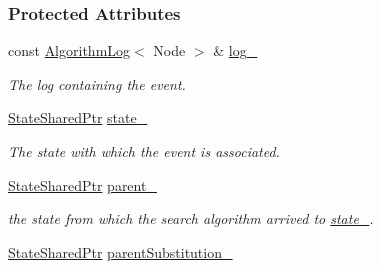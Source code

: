 \subsubsection*{Protected Attributes}
\begin{DoxyCompactItemize}
\item 
const \hyperlink{structslb_1_1core_1_1ui_1_1AlgorithmLog}{Algorithm\+Log}$<$ Node $>$ \& \hyperlink{structslb_1_1core_1_1ui_1_1EventBase_a188bf6c9b61aece44727bee80c0f284c}{log\+\_\+}\hypertarget{structslb_1_1core_1_1ui_1_1EventBase_a188bf6c9b61aece44727bee80c0f284c}{}\label{structslb_1_1core_1_1ui_1_1EventBase_a188bf6c9b61aece44727bee80c0f284c}

\begin{DoxyCompactList}\small\item\em The log containing the event. \end{DoxyCompactList}\item 
\hyperlink{structslb_1_1core_1_1ui_1_1EventBase_a50419d00607aad434bb97138eabe2c94}{State\+Shared\+Ptr} \hyperlink{structslb_1_1core_1_1ui_1_1EventBase_afdac9dcd9ab7162d0ae87f7b414ae9cb}{state\+\_\+}\hypertarget{structslb_1_1core_1_1ui_1_1EventBase_afdac9dcd9ab7162d0ae87f7b414ae9cb}{}\label{structslb_1_1core_1_1ui_1_1EventBase_afdac9dcd9ab7162d0ae87f7b414ae9cb}

\begin{DoxyCompactList}\small\item\em The state with which the event is associated. \end{DoxyCompactList}\item 
\hyperlink{structslb_1_1core_1_1ui_1_1EventBase_a50419d00607aad434bb97138eabe2c94}{State\+Shared\+Ptr} \hyperlink{structslb_1_1core_1_1ui_1_1EventBase_a6753a8d0750fee732416533768c7b532}{parent\+\_\+}\hypertarget{structslb_1_1core_1_1ui_1_1EventBase_a6753a8d0750fee732416533768c7b532}{}\label{structslb_1_1core_1_1ui_1_1EventBase_a6753a8d0750fee732416533768c7b532}

\begin{DoxyCompactList}\small\item\em the state from which the search algorithm arrived to \hyperlink{structslb_1_1core_1_1ui_1_1EventBase_afdac9dcd9ab7162d0ae87f7b414ae9cb}{state\+\_\+}. \end{DoxyCompactList}\item 
\hyperlink{structslb_1_1core_1_1ui_1_1EventBase_a50419d00607aad434bb97138eabe2c94}{State\+Shared\+Ptr} \hyperlink{structslb_1_1core_1_1ui_1_1EventBase_a24499f337e544dc299bdc7756d4c365c}{parent\+Substitution\+\_\+}\hypertarget{structslb_1_1core_1_1ui_1_1EventBase_a24499f337e544dc299bdc7756d4c365c}{}\label{structslb_1_1core_1_1ui_1_1EventBase_a24499f337e544dc299bdc7756d4c365c}


\end{DoxyCompactItemize}
